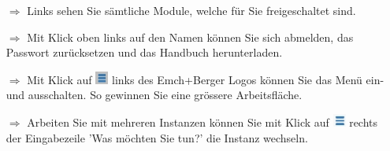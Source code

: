 \documentclass{article}
\begin{document}
\pagestyle{empty}



\vspace{\baselineskip}


\begin{multicols}{2}

\begin{tcolorbox}[colback=blue!5,colframe=blue!40!black,title=Die Menüführung]
\begin{itemize}
  \item[$\Longrightarrow$] Links sehen Sie sämtliche Module, welche für Sie freigeschaltet sind.
  \item[$\Longrightarrow$] Mit Klick oben links auf den Namen können Sie sich abmelden, das Passwort zurücksetzen und das Handbuch herunterladen.
\end{itemize}
\begin{centering}
\end{centering}
\begin{itemize}
  \item[$\Longrightarrow$] Mit Klick auf \includegraphics[height=12pt]{Icons/Menu_Aus-Ein.jpg} links des Emch+Berger Logos können Sie das Menü ein- und ausschalten. So gewinnen Sie eine grössere Arbeitsfläche.
	\item[$\Longrightarrow$] Arbeiten Sie mit mehreren Instanzen können Sie mit Klick auf \includegraphics[height=12pt]{Icons/Instanz_wechseln.jpg} rechts der Eingabezeile 'Was möchten Sie tun?' die Instanz wechseln.
\end{itemize}
\end{tcolorbox}





\end{multicols}
\end{document}
